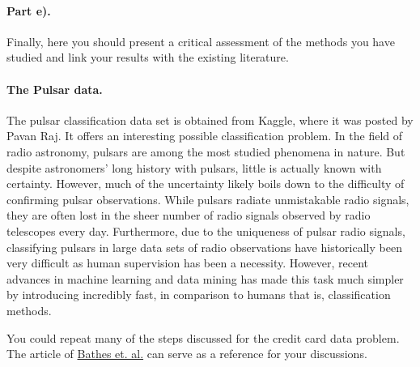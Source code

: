 \documentclass[%
oneside,                 %
final,                   %
10pt]{article}
\begin{document}
\paragraph{Part e).}
Finally, here you should present a critical assessment of the methods
you have studied and link your results with the existing literature.


\paragraph{The Pulsar data.}
The pulsar classification data set is obtained from
Kaggle, where it was posted by Pavan Raj. It offers an interesting
possible classification problem. In the field of radio astronomy,
pulsars are among the most studied phenomena in nature. But despite
astronomers' long history with pulsars, little is actually known with
certainty. However, much of the uncertainty likely boils down to the
difficulty of confirming pulsar observations. While pulsars radiate
unmistakable radio signals, they are often lost in the sheer number of
radio signals observed by radio telescopes every day. Furthermore, due
to the uniqueness of pulsar radio signals, classifying pulsars in
large data sets of radio observations have historically been very
difficult as human supervision has been a necessity. However, recent
advances in machine learning and data mining has made this task
much simpler by introducing incredibly fast, in comparison to humans
that is, classification methods.

You could repeat many of the steps discussed for the credit card data problem. The article of \href{{https://arxiv.org/abs/1209.0793}}{Bathes et. al.} can serve as a reference for your discussions.


\end{document}
